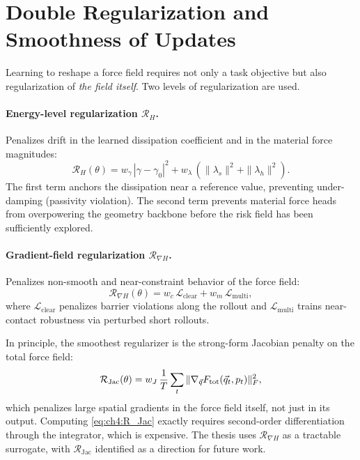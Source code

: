 \section{Double Regularization and Smoothness of Updates}
\label{sec:ch4:regularization}

Learning to reshape a force field requires not only a task objective but
also regularization of \emph{the field itself}.
Two levels of regularization are used.

\paragraph{Energy-level regularization $\mathcal{R}_H$.}
Penalizes drift in the learned dissipation coefficient and in the
material force magnitudes:
\begin{equation}
  \mathcal{R}_H(\theta)
  = w_\gamma\,|\gamma - \gamma_0|^2
  + w_\lambda\,(\|\lambda_s\|^2 + \|\lambda_h\|^2).
  \label{eq:ch4:R_H}
\end{equation}
The first term anchors the dissipation near a reference value,
preventing under-damping (passivity violation).
The second term prevents material force heads from overpowering the
geometry backbone before the risk field has been sufficiently explored.

\paragraph{Gradient-field regularization $\mathcal{R}_{\nabla H}$.}
Penalizes non-smooth and near-constraint behavior of the force field:
\begin{equation}
  \mathcal{R}_{\nabla H}(\theta)
  = w_c\,\mathcal{L}_{\mathrm{clear}}
  + w_m\,\mathcal{L}_{\mathrm{multi}},
  \label{eq:ch4:R_nablaH}
\end{equation}
where $\mathcal{L}_{\mathrm{clear}}$ penalizes barrier violations along
the rollout and $\mathcal{L}_{\mathrm{multi}}$ trains near-contact
robustness via perturbed short rollouts.

In principle, the smoothest regularizer is the strong-form Jacobian
penalty on the total force field:
\begin{equation}
  \mathcal{R}_{\mathrm{Jac}}(\theta)
  = w_J\,\frac{1}{T}\sum_t
    \|\nabla_{\vec{q}} F_{\mathrm{tot}}(\vec{q}_t,p_t)\|_F^2,
  \label{eq:ch4:R_Jac}
\end{equation}
which penalizes large spatial gradients in the force field itself,
not just in its output.
Computing \eqref{eq:ch4:R_Jac} exactly requires second-order
differentiation through the integrator, which is expensive.
The thesis uses $\mathcal{R}_{\nabla H}$ as a tractable surrogate,
with $\mathcal{R}_{\mathrm{Jac}}$ identified as a direction for future
work.

